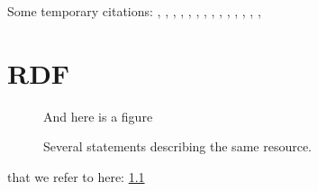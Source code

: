 \documentclass[a4paper,11pt]{kth-mag}
\begin{document}
Some temporary citations:
\cite{hoare69}, \cite{floyd67}, \cite{pnueli77},
\cite{leucker09abriefaccount}, \cite{bauer06monitoring}, \cite{bauer08goodbadugly}, \cite{delgado04taxonomy}, \cite{meyer92applyingdbc},
\cite{rosenblum95practicalassertions}, \cite{bartetzko01jass},
\cite{bodden04lightweightltl}, \cite{bodden05efficientrv},
\cite{becksmalltalktesting}, \cite{fowlerxunit},
\cite{matusiak09aoppy}












\appendix
\addappheadtotoc
\chapter{RDF}\label{appA}

\begin{figure}[ht]
\begin{center}
And here is a figure
\caption{\small{Several statements describing the same resource.}}\label{RDF_4}
\end{center}
\end{figure}

that we refer to here: \ref{RDF_4}
\end{document}
